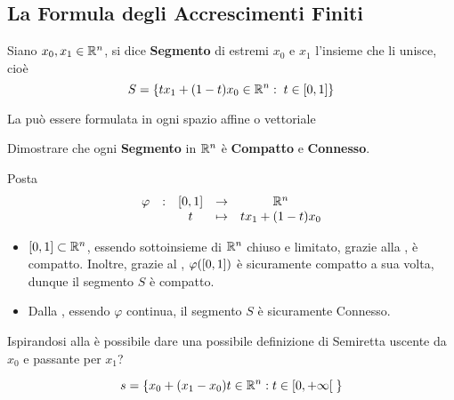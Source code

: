 \subsection{La Formula degli Accrescimenti Finiti}
\begin{definition}[Segmento]
	\label{def:segmento}
	Siano $x_0,x_1 \in \mathbb{R}^n$, si dice \textbf{Segmento} di estremi $x_0$ e $x_1$ l'insieme che li unisce, cioè
	\[S = \left\{tx_1+(1-t)x_0 \in \mathbb{R}^n:\; t \in \left[0,1\right]\right\}\]
\end{definition}
\begin{observation}
	La  può essere formulata in ogni spazio affine o vettoriale
\end{observation}
\begin{exercise}
	Dimostrare che ogni \textbf{Segmento} in $\mathbb{R}^n$ è \textbf{Compatto} e \textbf{Connesso}.
	\begin{solution}
		Posta
		\[\begin{array}{ccccc} {\varphi} & : & {\left[0,1\right]} & \to & {\mathbb{R}^n} \\ & & {t} & \mapsto & {t x_1 + (1-t) x_0} \\ \end{array}\]
		\begin{itemize}
			\item $\left[0,1\right] \subset \mathbb{R}^n$, essendo sottoinsieme di $\mathbb{R}^n$ chiuso e limitato, grazie alla , è compatto. Inoltre, grazie al , $\varphi(\left[0,1\right])$ è sicuramente compatto a sua volta, dunque il segmento $S$ è compatto.
			\item Dalla , essendo $\varphi$ continua, il segmento $S$ è sicuramente Connesso.
		\end{itemize}
	\end{solution}
\end{exercise}
\begin{exercise}
	Ispirandosi alla  è possibile dare una possibile definizione di Semiretta uscente da $x_0$ e passante per $x_1$?
	\begin{solution}
		\[s = \left\{x_0+(x_1-x_0)t \in \mathbb{R}^n: t \in \left[0,+\infty\right[ \;\right\}\]
	\end{solution}
\end{exercise}
